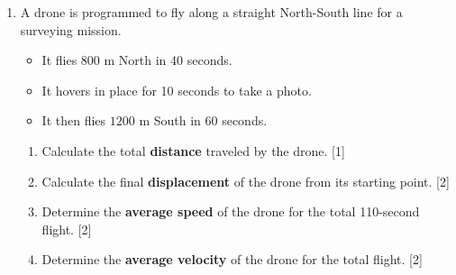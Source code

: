 \documentclass[12pt, twoside]{article}
\begin{document}
\begin{enumerate}[itemsep=0.15cm]
\newpage

\item A drone is programmed to fly along a straight North-South line for a surveying mission.
\begin{itemize}[itemsep=0.1cm]
  \item It flies $800 \text{ m}$ North in 40 seconds.
  \item It hovers in place for 10 seconds to take a photo.
  \item It then flies $1200 \text{ m}$ South in 60 seconds.
\end{itemize}
\begin{enumerate}[itemsep=0.1cm]
  \item Calculate the total \textbf{distance} traveled by the drone. \hfill [1]
  \item Calculate the final \textbf{displacement} of the drone from its starting point. \hfill [2]
  \item Determine the \textbf{average speed} of the drone for the total 110-second flight. \hfill [2]
  \item Determine the \textbf{average velocity} of the drone for the total flight. \hfill [2]
\end{enumerate}

\vfill



\end{enumerate}
\end{document}
